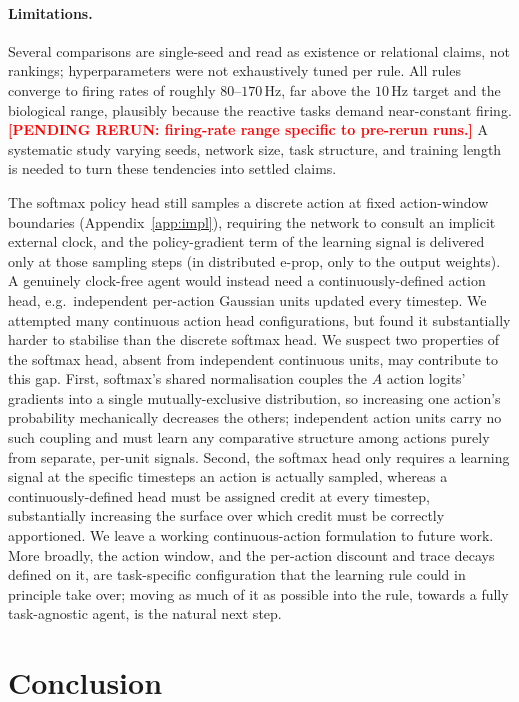 \documentclass[10pt,twocolumn]{article}
\newcommand{\pending}[1]{\textcolor{red}{\bfseries[PENDING RERUN#1]}}
\begin{document}
\paragraph{Limitations.}
Several comparisons are single-seed and read as existence or relational
claims, not rankings; hyperparameters were not exhaustively tuned per rule.
All rules converge to firing rates of roughly $80$--$170$\,Hz, far above the
$10$\,Hz target and the biological range, plausibly because the reactive tasks
demand near-constant firing.\pending{: firing-rate range specific to
pre-rerun runs.} A systematic study
varying seeds, network size, task structure, and training length is needed to
turn these tendencies into settled claims.

The softmax policy head still
samples a discrete action at fixed action-window boundaries
(Appendix~\ref{app:impl}), requiring the network to consult an implicit
external clock, and the policy-gradient term of the learning signal is
delivered only at those sampling steps (in distributed e-prop, only to the
output weights). A genuinely clock-free agent would instead need a
continuously-defined action head, e.g.\ independent per-action Gaussian units
updated every timestep. We attempted many continuous action head
configurations, but found it substantially harder to stabilise than the
discrete softmax head. We suspect two properties of the softmax head, absent from independent
continuous units, may contribute to this gap. First, softmax's shared
normalisation couples the $A$ action logits' gradients into a single
mutually-exclusive distribution, so increasing one action's probability
mechanically decreases the others; independent action units carry no such
coupling and must learn any comparative structure among actions purely from
separate, per-unit signals. Second, the softmax head only requires a learning
signal at the specific timesteps an action is actually sampled, whereas a
continuously-defined head must be assigned credit at every timestep,
substantially increasing the surface over which credit must be correctly
apportioned. We leave a working continuous-action formulation to future work.
More broadly, the action window, and the per-action discount and trace decays
defined on it, are task-specific configuration that the learning rule could in
principle take over; moving as much of it as possible into the rule, towards a
fully task-agnostic agent, is the natural next step.
\section{Conclusion}
\label{sec:conclusion}
\end{document}
